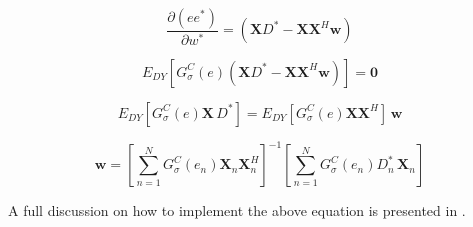 \documentclass[preprint,12pt]{elsarticle}
\begin{document}
\begin{equation}\nonumber
\frac{\partial (ee^*)}{\partial w^*} = (\textbf{X}D^* - \textbf{XX}^{H}\textbf{w})
\end{equation}



\begin{equation}\nonumber
E_{DY}[G^{C}_{\sigma}(e) (\textbf{X}D^* - \textbf{XX}^{H}\textbf{w}) ] = \textbf{0}
\end{equation}


\begin{equation}\nonumber
E_{DY}[G^{C}_{\sigma}(e)\textbf{X}\,D^{*}] = E_{DY}[G^{C}_{\sigma}(e)\textbf{XX}^{H}]\,\textbf{w}
\end{equation}

\begin{equation}
\textbf{w} = \left [ \sum_{n=1}^{N} G^{C}_{\sigma}(e_{n})\textbf{X}_{n}\textbf{X}_{n}^{H} \right ]^{-1} \left [ \sum_{n=1}^{N} G^{C}_{\sigma}(e_{n})\textit{D}_{n}^{*}\,\textbf{X}_{n} \right ]
\end{equation}

A full discussion on how to implement the above equation is presented in \citep{7763864}.







\end{document}
